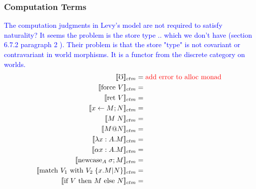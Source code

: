 \documentclass{article}
\makeatletter
\newcommand{\blue}[1]{\textcolor{blue}{#1}}
\newcommand{\red}[1]{\textcolor{red}{#1}}
\newcommand{\err}{\mho}
\newcommand{\force}[1]{\textrm{force }#1}
\newcommand{\ret}[1]{\textrm{ret }#1}
\newcommand{\bind}[3]{#1 \leftarrow #2 ; #3}
\newcommand{\newcase}[3]{\textrm{newcase}_{#1} \; #2 ; #3}
\newcommand{\match}[5]{\textrm{match }#1 \textrm{ with }#2 \;\{#3 . #4 | #5\}}
\newcommand{\ite}[3]{\textrm{if }#1 \textrm{ then }#2 \textrm{ else }#3}
\newcommand{\at}{\textrm{@}}
\makeatother
\begin{document}
\subsubsection{Computation Terms}
\blue{The computation judgments in Levy's model are not required to satisfy naturality? It seems the problem is the store type
.. which we don't have (section 6.7.2 paragraph 2 \cite{CBPV-Book}). Their problem is that the store "type" is not covariant or 
contravariant in world morphisms. It is a functor from the discrete category on worlds.}
\begin{align*}
    \llbracket \err \rrbracket_{ctm} &= \red{\textrm{add error to alloc monad}}\\
    \llbracket \force{V} \rrbracket_{ctm} &= \\
    \llbracket \ret{V} \rrbracket_{ctm} &= \\
    \llbracket \bind{x}{M}{N} \rrbracket_{ctm} &= \\
    \llbracket M \; N \rrbracket_{ctm} &= \\
    \llbracket M \at N \rrbracket_{ctm} &= \\
    \llbracket \lambda x : A . M \rrbracket_{ctm} &=  \\
    \llbracket \alpha x : A . M \rrbracket_{ctm} &= \\
    \llbracket \newcase{A}{\sigma}{M} \rrbracket_{ctm} &= \\
    \llbracket \match{V_1}{V_2}{x}{M}{N}\rrbracket_{ctm} &= \\
    \llbracket \ite{V}{M}{N} \rrbracket_{ctm} &= \\
\end{align*}




\end{document}
